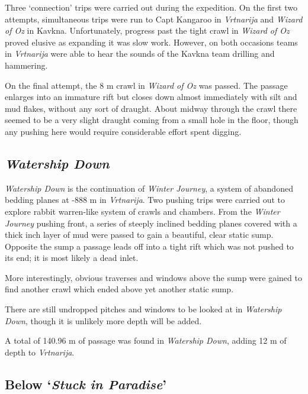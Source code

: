 Three `connection' trips were carried out during the expedition. On the
first two attempts, simultaneous trips were run to Capt Kangaroo in
\emph{Vrtnarija} and \emph{Wizard of Oz} in Kavkna. Unfortunately,
progress past the tight crawl in \emph{Wizard of Oz} proved elusive as
expanding it was slow work. However, on both occasions teams in
\emph{Vrtnarija} were able to hear the sounds of the Kavkna team
drilling and hammering.

On the final attempt, the 8 m crawl in \emph{Wizard of Oz} was passed.
The passage enlarges into an immature rift but closes down almost
immediately with silt and mud flakes, without any sort of draught. About
midway through the crawl there seemed to be a very slight draught coming
from a small hole in the floor, though any pushing here would require
considerable effort spent digging.

\hypertarget{watership-down}{%
\subsection{\texorpdfstring{\emph{Watership
Down}}{Watership Down}}\label{watership-down}}

\emph{Watership Down} is the continuation of \emph{Winter Journey}, a
system of abandoned bedding planes at -888 m in \emph{Vrtnarija}. Two
pushing trips were carried out to explore rabbit warren-like system of
crawls and chambers. From the \emph{Winter Journey} pushing front, a
series of steeply inclined bedding planes covered with a thick inch
layer of mud were passed to gain a beautiful, clear static sump.
Opposite the sump a passage leads off into a tight rift which was not
pushed to its end; it is most likely a dead inlet.

More interestingly, obvious traverses and windows above the sump were
gained to find another crawl which ended above yet another static sump.

There are still undropped pitches and windows to be looked at in
\emph{Watership Down}, though it is unlikely more depth will be added.

A total of 140.96 m of passage was found in \emph{Watership Down},
adding 12 m of depth to \emph{Vrtnarija}.

\hypertarget{below-stuck-in-paradise}{%
\subsection{\texorpdfstring{Below `\emph{Stuck in
Paradise}'}{Below `Stuck in Paradise'}}\label{below-stuck-in-paradise}}


